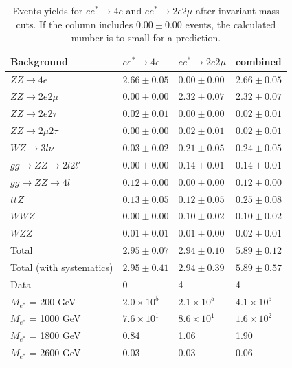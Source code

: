 \begin{table}[h!]
\begin{center}
\begin{tabular}{|l|l|l|l|}
\hline 
Background & $e e^{*}\rightarrow 4e$ & $e e^{*}\rightarrow 2e 2\mu$ & combined \\ 
\hline
$ZZ \rightarrow 4e$ & $2.66\pm 0.05$ & $0.00\pm 0.00$ & $2.66\pm 0.05$\\
$ZZ \rightarrow 2e 2\mu$ & $0.00\pm 0.00$ & $2.32\pm 0.07$ & $2.32\pm 0.07$\\
$ZZ \rightarrow 2e 2\tau$ & $0.02\pm 0.01$ & $0.00\pm 0.00$ & $0.02\pm 0.01$\\
$ZZ \rightarrow 2\mu 2\tau$ & $0.00\pm 0.00$ & $0.02\pm 0.01$ & $0.02\pm 0.01$\\
$WZ \rightarrow 3l \nu$ & $0.03\pm 0.02$ & $0.21\pm 0.05$ & $0.24\pm 0.05$\\
$gg \rightarrow ZZ \rightarrow 2l2l'$ & $0.00\pm 0.00$ & $0.14\pm 0.01$ & $0.14\pm 0.01$\\
$gg \rightarrow ZZ \rightarrow 4l$ & $0.12\pm 0.00$ & $0.00\pm 0.00$ & $0.12\pm 0.00$\\
$ttZ$ & $0.13\pm 0.05$ & $0.12\pm 0.05$ & $0.25\pm 0.08$\\
$WWZ$ & $0.00\pm 0.00$ & $0.10\pm 0.02$ & $0.10\pm 0.02$\\
$WZZ$ & $0.01\pm 0.01$ & $0.01\pm 0.00$ & $0.02\pm 0.01$\\
\hline
Total & $2.95\pm 0.07$ & $2.94\pm  0.10$ & $5.89\pm 0.12$ \\
Total (with systematics) & $2.95\pm 0.41$ & $2.94\pm 0.39$ & $5.89\pm 0.57$\\
\hline
\hline
Data & 0 & 4 & 4\\
\hline
\hline
$M_{e^{*}}$ = 200 GeV & $2.0 \times 10^{5}$  & $2.1 \times 10^{5}$ & $4.1 \times 10^{5}$\\
$M_{e^{*}}$ = 1000 GeV & $7.6 \times 10^{1}$ & $8.6 \times 10^{1}$ & $1.6 \times 10^{2}$\\
$M_{e^{*}}$ = 1800 GeV & 0.84 & 1.06 & 1.90\\
$M_{e^{*}}$ = 2600 GeV & 0.03 & 0.03 & 0.06\\
\hline
\end{tabular}
\end{center}
\caption{\label{tab:yieldsestarZ}Events yields for $e e^{*}\rightarrow 4e$ and $e e^{*}\rightarrow 2e 2\mu$ after invariant mass cuts. If the column includes $0.00 \pm 0.00$ events, the calculated number is to small for a prediction.}
\end{table}


